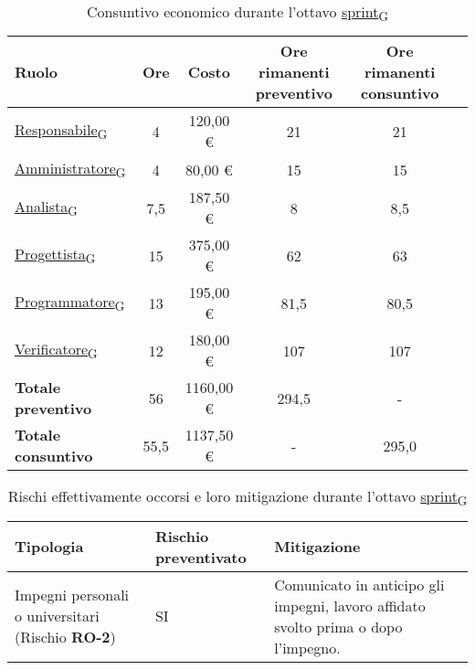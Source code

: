 \newpage
{} 
\begin{table}[!h]
    \centering
    \begin{tabular}{ | l | c | c | c | c | c | }
        \hline
        \textbf{Ruolo} & \textbf{Ore} & \textbf{Costo} & \textbf{Ore rimanenti preventivo} & \textbf{Ore rimanenti consuntivo} \\
        \hline
        \href{https://7last.github.io/docs/rtb/documentazione-interna/glossario\#responsabile}{Responsabile\textsubscript{G}}     &  4   &    120,00 € &  21   &  21   \\
        \href{https://7last.github.io/docs/rtb/documentazione-interna/glossario\#amministratore}{Amministratore\textsubscript{G}} &  4   &     80,00 € &  15   &  15   \\
        \href{https://7last.github.io/docs/rtb/documentazione-interna/glossario\#analista}{Analista\textsubscript{G}}             &  7,5 &    187,50 € &   8   &   8,5 \\
        \href{https://7last.github.io/docs/rtb/documentazione-interna/glossario\#progettista}{Progettista\textsubscript{G}}       & 15   &    375,00 € &  62   &  63   \\
        \href{https://7last.github.io/docs/rtb/documentazione-interna/glossario\#programmatore}{Programmatore\textsubscript{G}}   & 13   &    195,00 € &  81,5 &  80,5 \\
        \href{https://7last.github.io/docs/rtb/documentazione-interna/glossario\#verificatore}{Verificatore\textsubscript{G}}     & 12   &    180,00 € & 107   & 107   \\
        \hline
        \textbf{Totale preventivo} &  56   & 1160,00 € & 294,5 &   -   \\
        \hline
        \textbf{Totale consuntivo} &  55,5 & 1137,50 € &   -   &  295,0 \\
        \hline
    \end{tabular}
    \caption{Consuntivo economico durante l'ottavo \href{https://7last.github.io/docs/rtb/documentazione-interna/glossario\#sprint}{sprint\textsubscript{G}}}

\end{table}

\begin{table}[!h]
    \centering
    \begin{tabular}{ | p{6cm} | p{2.5cm} | p{7.5cm} | }
        \hline
        \textbf{Tipologia} & \textbf{Rischio preventivato} & \textbf{Mitigazione}  \\
        \hline
        Impegni personali o universitari (Rischio \textbf{RO-2})& SI & Comunicato in anticipo gli impegni, lavoro affidato svolto prima o dopo l’impegno. \\
        \hline
    \end{tabular}
    \caption{Rischi effettivamente occorsi e loro mitigazione durante l'ottavo \href{https://7last.github.io/docs/rtb/documentazione-interna/glossario\#sprint}{sprint\textsubscript{G}}}
\end{table}

